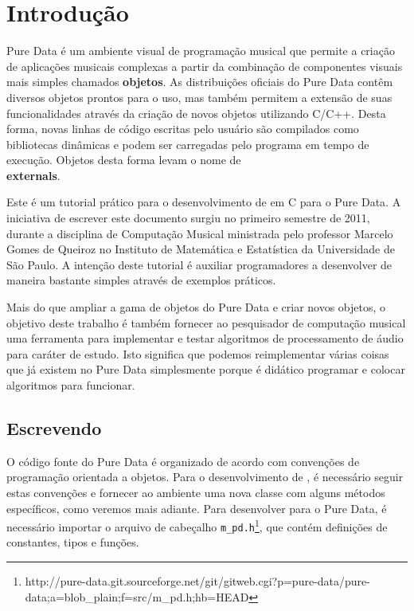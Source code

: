  
\chapter{Introdução}

Pure Data é um ambiente visual de programação musical que permite a criação de
aplicações musicais complexas a partir da combinação de componentes visuais
mais simples chamados \textbf{objetos}. As distribuições oficiais do Pure Data
contêm diversos objetos prontos para o uso, mas também permitem a extensão de
suas funcionalidades através da criação de novos objetos utilizando C/C++.
Desta forma, novas linhas de código escritas pelo usuário são compilados como
bibliotecas dinâmicas e podem ser carregadas pelo programa em tempo de
execução. Objetos desta forma levam o nome de \textbf{\\externals}.

Este é um tutorial prático para o desenvolvimento de \externals em C para o
Pure Data. A iniciativa de escrever este documento surgiu no primeiro semestre
de 2011, durante a disciplina de Computação Musical ministrada pelo professor
Marcelo Gomes de Queiroz no Instituto de Matemática e Estatística da
Universidade de São Paulo. A intenção deste tutorial é auxiliar programadores
a desenvolver \externals de maneira bastante simples através de exemplos
práticos.

Mais do que ampliar a gama de objetos do Pure Data e criar novos objetos, o
objetivo deste trabalho é também fornecer ao pesquisador de computação musical
uma ferramenta para implementar e testar algoritmos de processamento de áudio
para caráter de estudo. Isto significa que podemos reimplementar várias coisas
que já existem no Pure Data simplesmente porque é didático programar e colocar
algoritmos para funcionar.

\section{Escrevendo \externals}

O código fonte do Pure Data é organizado de acordo com convenções de
programação orientada a objetos. Para o desenvolvimento de \externals, é
necessário seguir estas convenções e fornecer ao ambiente uma nova classe com
alguns métodos específicos, como veremos mais adiante. Para desenvolver para o
Pure Data, é necessário importar o arquivo de cabeçalho
\texttt{m\_pd.h}\footnote{http://pure-data.git.sourceforge.net/git/gitweb.cgi?p=pure-data/pure-data;a=blob\_plain;f=src/m\_pd.h;hb=HEAD},
que contém definições de constantes, tipos e funções.

